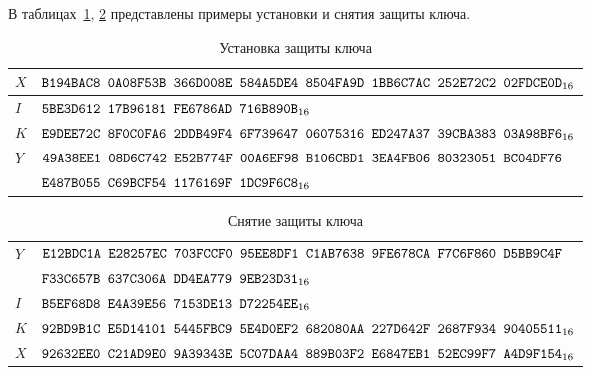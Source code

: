 \label{TEST.KWP}

В таблицах~\ref{Table.TEST.KeyWrap}, \ref{Table.TEST.KeyUnwrap} 
представлены примеры установки и снятия защиты ключа.

\begin{table}[H]
\caption{Установка защиты ключа}\label{Table.TEST.KeyWrap}
\begin{tabular}{|l|l|}
\hline
$X$ &
$\texttt{B194BAC8~0A08F53B~366D008E~584A5DE4~8504FA9D~1BB6C7AC~252E72C2~02FDCE0D}_{16}$\\
\hline
$I$ &
$\texttt{5BE3D612~17B96181~FE6786AD~716B890B}_{16}$\\
\hline
$K$ & 
$\texttt{E9DEE72C~8F0C0FA6~2DDB49F4~6F739647~06075316~ED247A37~39CBA383~03A98BF6}_{16}$\\
\dhline
$Y$ &
$\texttt{49A38EE1~08D6C742~E52B774F~00A6EF98~B106CBD1~3EA4FB06~80323051~BC04DF76}$\\
&
$\texttt{E487B055~C69BCF54~1176169F~1DC9F6C8}_{16}$\\
\hline
\end{tabular}
\end{table}

\begin{table}[H]
\caption{Снятие защиты ключа}\label{Table.TEST.KeyUnwrap}
\begin{tabular}{|l|l|}
\hline
$Y$ &
$\texttt{E12BDC1A~E28257EC~703FCCF0~95EE8DF1~C1AB7638~9FE678CA~F7C6F860~D5BB9C4F}$\\
&
$\texttt{F33C657B~637C306A~DD4EA779~9EB23D31}_{16}$\\
\hline
$I$ & 
$\texttt{B5EF68D8~E4A39E56~7153DE13~D72254EE}_{16}$\\
\hline
$K$ & 
$\texttt{92BD9B1C~E5D14101~5445FBC9~5E4D0EF2~682080AA~227D642F~2687F934~90405511}_{16}$\\
\dhline
$X$ &
$\texttt{92632EE0~C21AD9E0~9A39343E~5C07DAA4~889B03F2~E6847EB1~52EC99F7~A4D9F154}_{16}$\\
\hline
\end{tabular}
\end{table}

